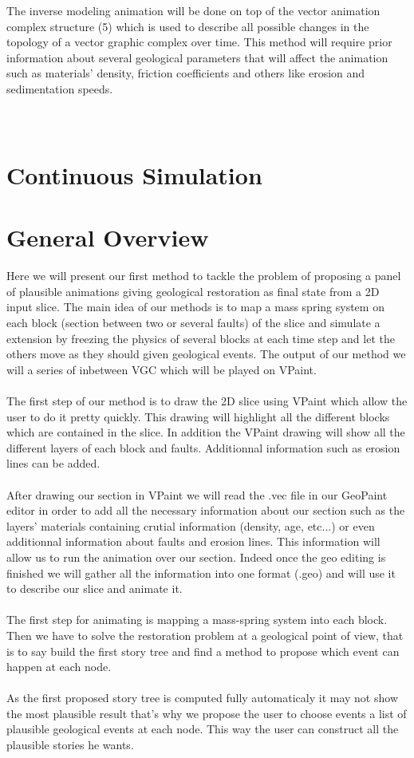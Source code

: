 \documentclass[12pt, a4paper]{memoir} %
\begin{document}
The inverse modeling animation will be done on top of the vector animation complex structure (5) which is used to describe all possible changes in the topology of a vector graphic complex over time. This method will require prior information about several geological parameters that will affect the animation such as materials’ density, friction coefficients and others like erosion and sedimentation speeds.\\\\\

\section{Continuous Simulation}

\section{General Overview}

Here we will present our first method to tackle the problem of proposing a panel of plausible animations giving geological restoration as final state from a 2D input slice. 
The main idea of our methods is to map a mass spring system on each block (section between two or several faults) of the slice and simulate a extension by freezing the physics of several blocks at each time step and let the others move as they should given geological events. The output of our method we will a series of inbetween VGC which will be played on VPaint.\\\\
The first step of our method is to draw the 2D slice using VPaint which allow the user to do it pretty quickly.
This drawing will highlight all the different blocks which are contained in the slice.
In addition the VPaint drawing will show all the different layers of each block and faults. Additionnal information such as erosion lines can be added. \\\\
After drawing our section in VPaint we will read the .vec file in our GeoPaint editor in order to add all the necessary information about our section such as the layers' materials containing crutial information (density, age, etc...) or even  additionnal information about faults and erosion lines. This information will allow us to run the animation over our section.
Indeed once the geo editing is finished we will gather all the information into one format (.geo) and will use it to describe our slice and animate it.\\\\
The first step for animating is mapping a mass-spring system into each block. Then we have to solve the restoration problem at a geological point of view, that is to say build the first story tree and find a method to propose which event can happen at each node.\\\\
As the first proposed story tree is computed fully automaticaly it may not show the most plausible result that's why we propose the user to choose events a list of plausible geological events at each node.
This way the user can construct all the plausible stories he wants.
\end{document}
